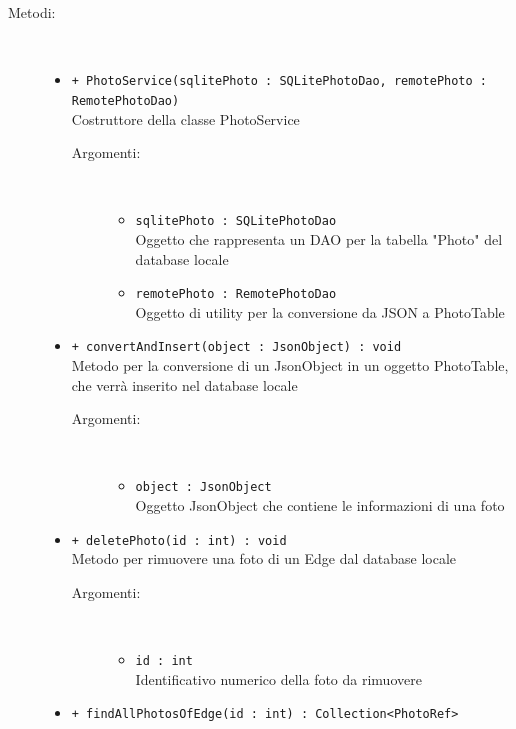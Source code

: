 \documentclass[../DefinizioneDiProdotto.tex]{subfiles}
\begin{document}
\begin{description}
\begin{itemize}
	\end{itemize}
	\item[Metodi:] \
	\begin{itemize}
		\item \texttt{+ PhotoService(sqlitePhoto : SQLitePhotoDao, remotePhoto : RemotePhotoDao)}\\
		Costruttore della classe PhotoService
		\begin{description}
			\item[Argomenti:] \
			\begin{itemize}
				\item \texttt{sqlitePhoto : SQLitePhotoDao}\\
				Oggetto che rappresenta un DAO per la tabella "Photo" del database locale\item \texttt{remotePhoto : RemotePhotoDao}\\
				Oggetto di utility per la conversione da JSON a PhotoTable\end{itemize}
		\end{description}
		\item \texttt{+ convertAndInsert(object : JsonObject) : void}\\
		Metodo per la conversione di un JsonObject in un oggetto PhotoTable, che verrà inserito nel database locale
		\begin{description}
			\item[Argomenti:] \
			\begin{itemize}
				\item \texttt{object : JsonObject}\\
				Oggetto JsonObject che contiene le informazioni di una foto\end{itemize}
		\end{description}
		\item \texttt{+ deletePhoto(id : int) : void}\\
		Metodo per rimuovere una foto di un Edge dal database locale
		\begin{description}
			\item[Argomenti:] \
			\begin{itemize}
				\item \texttt{id : int}\\
				Identificativo numerico della foto da rimuovere\end{itemize}
		\end{description}
		\item \texttt{+ findAllPhotosOfEdge(id : int) : Collection<PhotoRef>}\\

\end{itemize}
\end{description}
\end{document}
